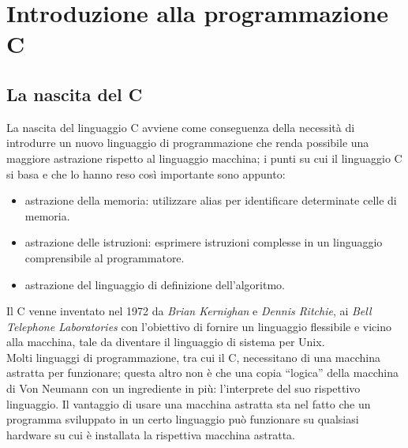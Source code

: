 \chapter{Introduzione alla programmazione C}

\section{La nascita del C}
La nascita del linguaggio C avviene come conseguenza della necessità di introdurre un nuovo linguaggio di programmazione che renda possibile una maggiore astrazione rispetto al linguaggio macchina; i punti su cui il linguaggio C si basa e che lo hanno reso così importante sono appunto:
\begin{itemize}[noitemsep]
	\item astrazione della memoria: utilizzare alias per identificare determinate celle di memoria.
	\item astrazione delle istruzioni: esprimere istruzioni complesse in un linguaggio comprensibile al programmatore.
	\item astrazione del linguaggio di definizione dell'algoritmo.
\end{itemize}
Il C venne inventato nel 1972 da \textit{Brian Kernighan} e \textit{Dennis Ritchie}, ai \textit{Bell Telephone Laboratories} con l’obiettivo di fornire un linguaggio flessibile e vicino alla macchina, tale da diventare il linguaggio di sistema per Unix.\\
Molti linguaggi di programmazione, tra cui il C, necessitano di una macchina astratta per funzionare; questa altro non è che una copia “logica” della macchina di Von Neumann con un ingrediente in più: l’interprete del suo rispettivo linguaggio. Il vantaggio di usare una macchina astratta sta nel fatto che un programma sviluppato in un certo linguaggio può funzionare su qualsiasi hardware su cui è installata la rispettiva macchina astratta.

